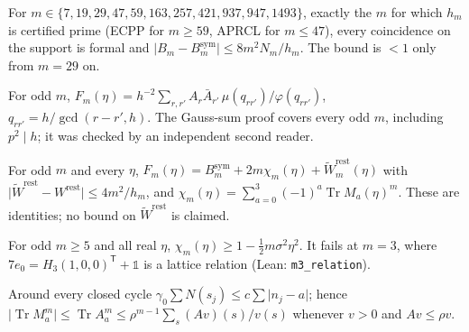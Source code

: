 \begin{theorem}
For \(m\in\{7,\allowbreak 19,\allowbreak 29,\allowbreak 47,\allowbreak 59,\allowbreak 163,\allowbreak 257,\allowbreak 421,\allowbreak 937,\allowbreak 947,\allowbreak 1493\}\), exactly the \(m\) for which \(h_m\) is certified prime
(ECPP for \(m\ge 59\), APRCL for \(m\le 47\)), every coincidence on the support is formal and
\(\lvert B_m-B^{\mathrm{sym}}_m\rvert\le 8m^2N_m/h_m\). The bound is \(<1\) only from \(m=29\) on.
\end{theorem}

\begin{proposition}
For odd \(m\), \(F_m(\eta)=h^{-2}\sum_{r,r'}A_r\bar A_{r'}\,\mu(q_{rr'})/\varphi(q_{rr'})\), \(q_{rr'}=h/\gcd(r-r',h)\).
The Gauss-sum proof covers every odd \(m\), including \(p^2\mid h\); it was checked by an independent second reader.
\end{proposition}

\begin{theorem}
For odd \(m\) and every \(\eta\), \(F_m(\eta)=B^{\mathrm{sym}}_m+2m\chi_m(\eta)+\tilde W^{\mathrm{rest}}_m(\eta)\) with
\(\lvert\tilde W^{\mathrm{rest}}-W^{\mathrm{rest}}\rvert\le 4m^2/h_m\), and
\(\chi_m(\eta)=\sum_{a=0}^{3}(-1)^a\operatorname{Tr}M_a(\eta)^m\). These are identities; no bound on \(\tilde W^{\mathrm{rest}}\) is claimed.
\end{theorem}

\begin{theorem}
For odd \(m\ge 5\) and all real \(\eta\), \(\chi_m(\eta)\ge 1-\tfrac12 m\sigma^2\eta^2\). It fails at \(m=3\), where \(7e_0=H_3(1,0,0)^{\mathsf T}+\mathbb 1\) is a lattice relation (Lean: \texttt{m3\_relation}).
\end{theorem}

\begin{lemma}
Around every closed cycle \(\gamma_0\sum N(s_j)\le c\sum\lvert n_j-a\rvert\); hence \(\lvert\operatorname{Tr}M_a^m\rvert\le\operatorname{Tr}A_a^m\le\rho^{m-1}\sum_s(Av)(s)/v(s)\) whenever \(v>0\) and \(Av\le\rho v\).
\end{lemma}

